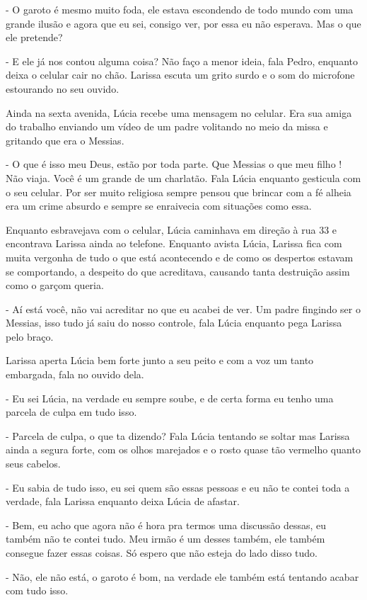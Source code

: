 - O garoto é mesmo muito foda, ele estava escondendo de todo mundo com uma grande ilusão e agora que eu sei, consigo ver, por essa eu não esperava. Mas o que ele pretende?

- E ele já nos contou alguma coisa? Não faço a menor ideia, fala Pedro, enquanto deixa o celular cair no chão. Larissa escuta um grito surdo e o som do microfone estourando no seu ouvido.

Ainda na sexta avenida, Lúcia recebe uma mensagem no celular. Era sua amiga do trabalho enviando um vídeo de um padre volitando no meio da missa e gritando que era o Messias.

- O que é isso meu Deus, estão por toda parte. Que Messias o que meu filho ! Não viaja. Você é um grande de um charlatão. Fala Lúcia enquanto gesticula com o seu celular. Por ser muito religiosa sempre pensou que brincar com a fé alheia era um crime absurdo e sempre se enraivecia com situações como essa.

Enquanto esbravejava com o celular, Lúcia caminhava em direção à rua 33 e encontrava Larissa ainda ao telefone. Enquanto avista Lúcia, Larissa fica com muita vergonha de tudo o que está acontecendo e de como os despertos estavam se comportando, a despeito do que acreditava, causando tanta destruição assim como o garçom queria.

- Aí está você, não vai acreditar no que eu acabei de ver. Um padre fingindo ser o Messias, isso tudo já saiu do nosso controle, fala Lúcia enquanto pega Larissa pelo braço.

Larissa aperta Lúcia bem forte junto a seu peito e com a voz  um tanto embargada, fala no ouvido dela.

- Eu sei Lúcia, na verdade eu sempre soube, e de certa forma eu tenho uma parcela de culpa em tudo isso.

- Parcela de culpa, o que ta dizendo? Fala Lúcia tentando se soltar mas Larissa ainda a segura forte, com os olhos marejados e o rosto quase tão vermelho quanto seus cabelos.

- Eu sabia de tudo isso, eu sei quem são essas pessoas e eu não te contei toda a verdade, fala Larissa enquanto deixa Lúcia de afastar.

- Bem, eu acho que agora não é hora pra termos uma discussão dessas, eu também não te contei tudo. Meu irmão é um desses também, ele também consegue fazer essas coisas. Só espero que não esteja do lado disso tudo.

- Não, ele não está, o garoto é bom, na verdade ele também está tentando acabar com tudo isso.


